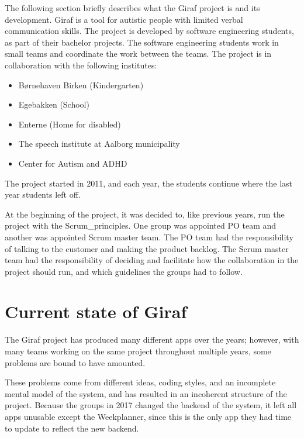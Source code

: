 The following section briefly describes what the Giraf project is and its development. 
Giraf is a tool for autistic people with limited verbal communication skills. The project is developed by software engineering students, as part of their bachelor projects. The software engineering students work in small teams and coordinate the work between the teams. The project is in collaboration with the following institutes\cite{GirafWebsite}:

\begin{itemize}
    \item Børnehaven Birken (Kindergarten) \cite{bhBirken}
    \item Egebakken (School) \cite{egebakken}
    \item Enterne (Home for disabled) \cite{enterne}
    \item The speech institute at Aalborg municipality
    \item Center for Autism and ADHD \cite{center_for_autism}
\end{itemize}

The project started in 2011, and each year, the students continue where the last year students left off.

At the beginning of the project, it was decided to, like previous years, run the project with the \gls{Scrum_principles}. One group was appointed \gls{PO} team and another was appointed Scrum master team. The \gls{PO} team had the responsibility of talking to the customer and making the product backlog. The Scrum master team had the responsibility of deciding and facilitate how the collaboration in the project should run, and which guidelines the groups had to follow.

\section{Current state of Giraf}

The Giraf project has produced many different apps over the years; however, with many teams working on the same project throughout multiple years, some problems are bound to have amounted.

These problems come from different ideas, coding styles, and an incomplete mental model of the system, and has resulted in an incoherent structure of the project. Because the groups in 2017 \cite{SW608F18} changed the backend of the system, it left all apps unusable except the Weekplanner, since this is the only app they had time to update to reflect the new backend.


